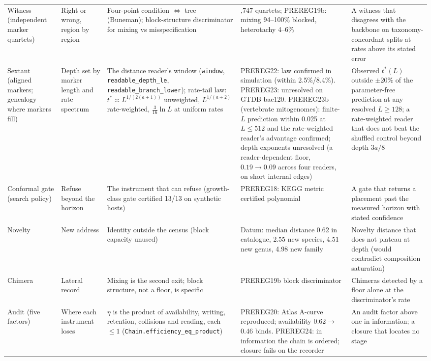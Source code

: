 \documentclass[10pt]{article}
\begin{document}
\begin{longtable}{@{}>{\raggedright\arraybackslash}p{2.6cm}>{\raggedright\arraybackslash}p{2.9cm}>{\raggedright\arraybackslash}p{4.2cm}>{\raggedright\arraybackslash}p{3.4cm}>{\raggedright\arraybackslash}p{3.4cm}@{}}
Witness (independent marker quartets) & Right or wrong, region by region & Four-point condition $\Leftrightarrow$ tree (Buneman); block-structure discriminator for mixing vs misspecification & 113,747 quartets; PREREG19b: mixing 94--100\% blocked, heterotachy 4--6\% & A witness that disagrees with the backbone on taxonomy-concordant splits at rates above its stated error\\
Sextant (aligned markers; genealogy where markers fill) & Depth set by marker length and rate spectrum & The distance reader's window (\texttt{window}, \texttt{readable\_\allowbreak{}depth\_\allowbreak{}le}, \texttt{readable\_\allowbreak{}branch\_\allowbreak{}lower}); rate-tail law: $t^*\asymp L^{1/(2(a+1))}$ unweighted, $L^{1/(a+2)}$ rate-weighted, $\tfrac{3}{16}\ln L$ at uniform rates & PREREG22: law confirmed in simulation (within 2.5\%/8.4\%). PREREG23: unresolved on GTDB bac120. PREREG23b (vertebrate mitogenomes): finite-$L$ prediction within 0.025 at $L\le512$ and the rate-weighted reader's advantage confirmed; depth exponents unresolved (a reader-dependent floor, $0.19\to0.09$ across four readers, on short internal edges) & Observed $t^*(L)$ outside $\pm20\%$ of the parameter-free prediction at any resolved $L\ge128$; a rate-weighted reader that does not beat the shuffled control beyond depth $3a/8$\\
Conformal gate (search policy) & Refuse beyond the horizon & The instrument that can refuse (growth-class gate certified 13/13 on synthetic hosts) & PREREG18: KEGG metric certified polynomial & A gate that returns a placement past the measured horizon with stated confidence\\
Novelty & New address & Identity outside the census (block capacity unused) & Datum: median distance 0.62 in catalogue, 2.55 new species, 4.51 new genus, 4.98 new family & Novelty distance that does not plateau at depth (would contradict composition saturation)\\
Chimera & Lateral record & Mixing is the second exit; block structure, not a floor, is specific & PREREG19b block discriminator & Chimeras detected by a floor alone at the discriminator's rate\\
Audit (five factors) & Where each instrument loses & $\eta$ is the product of availability, writing, retention, collisions and reading, each $\le1$ (\texttt{Chain.efficiency\_\allowbreak{}eq\_\allowbreak{}product}) & PREREG20: Atlas A-curve reproduced; availability 0.62$\to$0.46 binds. PREREG24: in information the chain is ordered; closure fails on the recorder & An audit factor above one in information; a closure that locates no stage\\
\bottomrule
\end{longtable}
\normalsize
\end{document}
